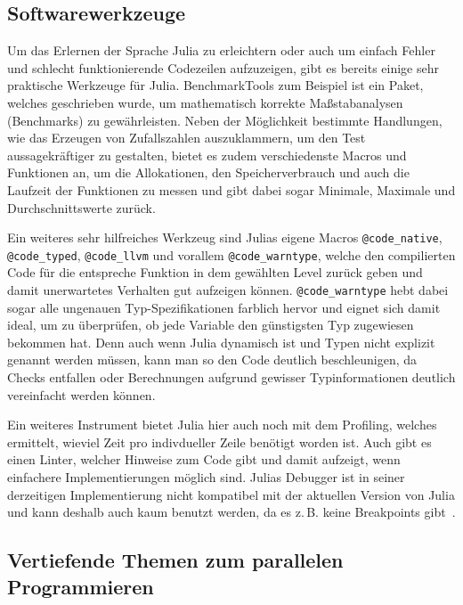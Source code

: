 \documentclass[proseminar,german,utf8]{zihpub}
\newcommand{\zB}[0]{{z.\,B. }}
\begin{document}
\subsection{Softwarewerkzeuge}

Um das Erlernen der Sprache Julia zu erleichtern oder auch um einfach Fehler und schlecht funktionierende Codezeilen aufzuzeigen, gibt es bereits einige sehr praktische Werkzeuge für Julia. BenchmarkTools zum Beispiel ist ein Paket, welches geschrieben wurde, um mathematisch korrekte Maßstabanalysen (Benchmarks) zu gewährleisten. Neben der Möglichkeit bestimmte Handlungen, wie das Erzeugen von Zufallszahlen auszuklammern, um den Test aussagekräftiger zu gestalten, bietet es zudem verschiedenste Macros und Funktionen an, um die Allokationen, den Speicherverbrauch und auch die Laufzeit der Funktionen zu messen und gibt dabei sogar Minimale, Maximale und Durchschnittswerte zurück. 

Ein weiteres sehr hilfreiches Werkzeug sind Julias eigene Macros \verb|@code_native|, \verb|@code_typed|, \verb|@code_llvm| und vorallem \verb|@code_warntype|, welche den compilierten Code für die entspreche Funktion in dem gewählten Level zurück geben und damit unerwartetes Verhalten gut aufzeigen können. \verb|@code_warntype| hebt dabei sogar alle ungenauen Typ-Spezifikationen farblich hervor und eignet sich damit ideal, um zu überprüfen, ob jede Variable den günstigsten Typ zugewiesen bekommen hat. Denn auch wenn Julia dynamisch ist und Typen nicht explizit genannt werden müssen, kann man so den Code deutlich beschleunigen, da Checks entfallen oder Berechnungen aufgrund gewisser Typinformationen deutlich vereinfacht werden können. 

Ein weiteres Instrument bietet Julia hier auch noch mit dem Profiling, welches ermittelt, wieviel Zeit pro indivdueller Zeile benötigt worden ist. Auch gibt es einen Linter, welcher Hinweise zum Code gibt und damit aufzeigt, wenn einfachere Implementierungen möglich sind. Julias Debugger ist in seiner derzeitigen Implementierung nicht kompatibel mit der aktuellen Version von Julia und kann deshalb auch kaum benutzt werden, da es \zB keine Breakpoints gibt~\cite{JuliaLangDocumentation}.

\subsection{Vertiefende Themen zum parallelen Programmieren}
\end{document}
